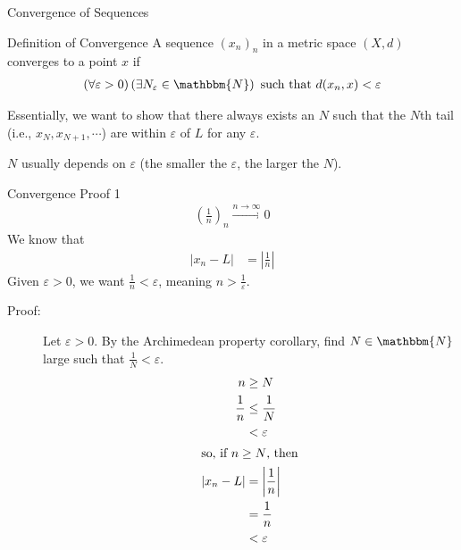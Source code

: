 \documentclass[10pt]{extarticle}
\newcommand{\N}{\mathbbm{N}}
\begin{document}
\begin{problem}{Convergence of Sequences}
\begin{problem}{Definition of Convergence}
      A sequence $(x_n)_n$ in a metric space $(X,d)$ converges to a point $x$ if
      \begin{align*}
        \left(\forall \varepsilon > 0\right)\left(\exists N_{\varepsilon}\in\N\right) \text{ such that } d(x_n,x) < \varepsilon
      \end{align*}
    \end{problem}
    Essentially, we want to show that there always exists an $N$ such that the $N$th tail (i.e., $x_{N}, x_{N+1},\cdots$) are within $\varepsilon$ of $L$ for any $\varepsilon$.
    \begin{description}
      \small
      \item[Note:] $N$ usually depends on $\varepsilon$ (the smaller the $\varepsilon$, the larger the $N$).
    \end{description}
    \begin{problem}{Convergence Proof 1}
      \begin{align*}
        \left(\frac{1}{n}\right)_{n} \xrightarrow{n\rightarrow\infty} 0
      \end{align*}
      \tcblower
      We know that
      \begin{align*}
        |x_n - L| &= \left|\frac{1}{n}\right|
      \end{align*}
      Given $\varepsilon > 0$, we want $\frac{1}{n} < \varepsilon$, meaning $n > \frac{1}{\varepsilon}$.
      \begin{description}
        \item[Proof:] Let $\varepsilon > 0$. By the Archimedean property corollary, find $N\in\N$ large such that $\frac{1}{N} < \varepsilon$.
          \begin{align*}
            n &\geq N\\
            \frac{1}{n} &\leq \frac{1}{N}\\
                        &< \varepsilon\\
            \shortintertext{so, if $n\geq N$, then}
            |x_n - L| &= \left|\frac{1}{n}\right|\\
                      &= \frac{1}{n}\\
                      &< \varepsilon
          \end{align*}
      \end{description}
    \end{problem}
  \end{problem}
\end{document}
